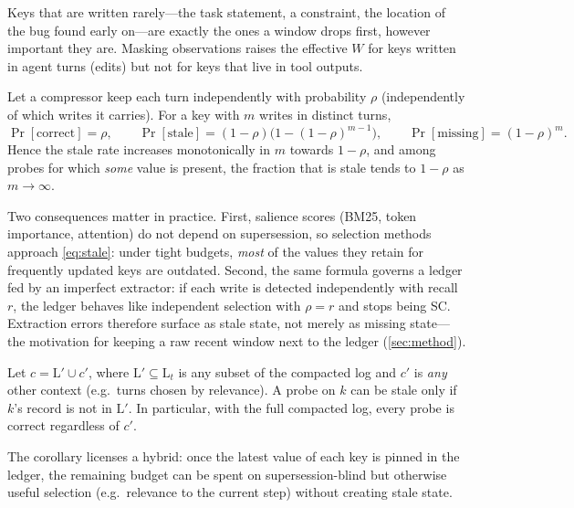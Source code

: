 Keys that are written rarely---the task statement, a constraint, the location
of the bug found early on---are exactly the ones a window drops first, however
important they are. Masking observations raises the effective $W$ for keys
written in agent turns (edits) but not for keys that live in tool outputs.

\begin{proposition}
\label{prop:stale}
Let a compressor keep each turn independently with probability $\rho$
(independently of which writes it carries). For a key with $m$ writes in
distinct turns,
\begin{equation}
\Pr[\text{correct}]=\rho,\qquad
\Pr[\text{stale}]=(1-\rho)\bigl(1-(1-\rho)^{m-1}\bigr),\qquad
\Pr[\text{missing}]=(1-\rho)^m .
\label{eq:stale}
\end{equation}
Hence the stale rate increases monotonically in $m$ towards $1-\rho$, and among
probes for which \emph{some} value is present, the fraction that is stale tends
to $1-\rho$ as $m\to\infty$.
\end{proposition}

Two consequences matter in practice. First, salience scores (BM25, token
importance, attention) do not depend on supersession, so selection methods
approach \cref{eq:stale}: under tight budgets, \emph{most} of the values they
retain for frequently updated keys are outdated. Second, the same formula
governs a ledger fed by an imperfect extractor: if each write is detected
independently with recall $r$, the ledger behaves like independent selection
with $\rho=r$ and stops being SC. Extraction errors therefore surface as stale
state, not merely as missing state---the motivation for keeping a raw recent
window next to the ledger (\cref{sec:method}).

\begin{corollary}
\label{cor:safe}
Let $c=\mathrm{L}'\cup c'$, where $\mathrm{L}'\subseteq\mathrm{L}_t$ is any subset
of the compacted log and $c'$ is \emph{any} other context (e.g.\ turns chosen by
relevance). A probe on $k$ can be stale only if $k$'s record is not in
$\mathrm{L}'$. In particular, with the full compacted log, every probe is
correct regardless of $c'$.
\end{corollary}

The corollary licenses a hybrid: once the latest value of each key is pinned in
the ledger, the remaining budget can be spent on supersession-blind but
otherwise useful selection (e.g.\ relevance to the current step) without
creating stale state.

